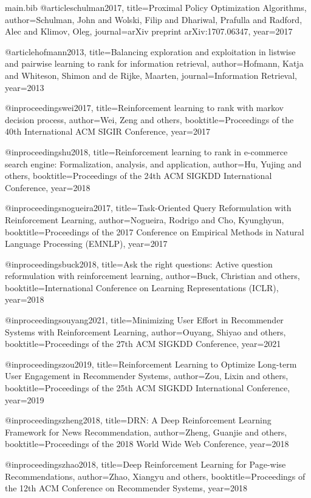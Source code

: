 \begin{filecontents*}{main.bib}
@article{schulman2017,
  title={Proximal Policy Optimization Algorithms},
  author={Schulman, John and Wolski, Filip and Dhariwal, Prafulla and Radford, Alec and Klimov, Oleg},
  journal={arXiv preprint arXiv:1707.06347},
  year={2017}
}

@article{hofmann2013,
  title={Balancing exploration and exploitation in listwise and pairwise learning to rank for information retrieval},
  author={Hofmann, Katja and Whiteson, Shimon and de Rijke, Maarten},
  journal={Information Retrieval},
  year={2013}
}

@inproceedings{wei2017,
  title={Reinforcement learning to rank with markov decision process},
  author={Wei, Zeng and others},
  booktitle={Proceedings of the 40th International ACM SIGIR Conference},
  year={2017}
}

@inproceedings{hu2018,
  title={Reinforcement learning to rank in e-commerce search engine: Formalization, analysis, and application},
  author={Hu, Yujing and others},
  booktitle={Proceedings of the 24th ACM SIGKDD International Conference},
  year={2018}
}

@inproceedings{nogueira2017,
  title={Task-Oriented Query Reformulation with Reinforcement Learning},
  author={Nogueira, Rodrigo and Cho, Kyunghyun},
  booktitle={Proceedings of the 2017 Conference on Empirical Methods in Natural Language Processing (EMNLP)},
  year={2017}
}

@inproceedings{buck2018,
  title={Ask the right questions: Active question reformulation with reinforcement learning},
  author={Buck, Christian and others},
  booktitle={International Conference on Learning Representations (ICLR)},
  year={2018}
}

@inproceedings{ouyang2021,
  title={Minimizing User Effort in Recommender Systems with Reinforcement Learning},
  author={Ouyang, Shiyao and others},
  booktitle={Proceedings of the 27th ACM SIGKDD Conference},
  year={2021}
}

@inproceedings{zou2019,
  title={Reinforcement Learning to Optimize Long-term User Engagement in Recommender Systems},
  author={Zou, Lixin and others},
  booktitle={Proceedings of the 25th ACM SIGKDD International Conference},
  year={2019}
}

@inproceedings{zheng2018,
  title={DRN: A Deep Reinforcement Learning Framework for News Recommendation},
  author={Zheng, Guanjie and others},
  booktitle={Proceedings of the 2018 World Wide Web Conference},
  year={2018}
}

@inproceedings{zhao2018,
  title={Deep Reinforcement Learning for Page-wise Recommendations},
  author={Zhao, Xiangyu and others},
  booktitle={Proceedings of the 12th ACM Conference on Recommender Systems},
  year={2018}
}


\end{filecontents*}
